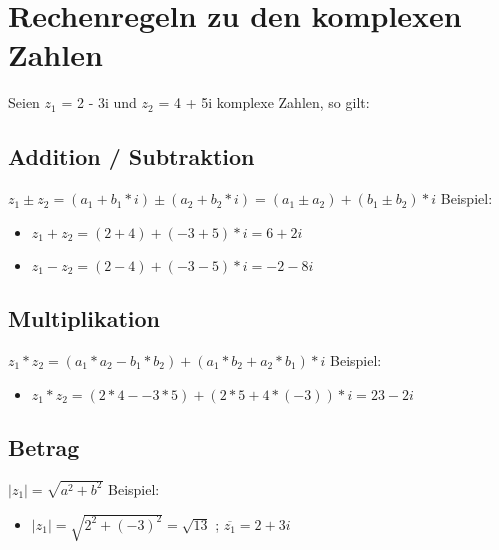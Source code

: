 \documentclass[12pt]{article}
\begin{document}
    \section{Rechenregeln zu den komplexen Zahlen}

    Seien $z_1$ = 2 - 3i und $z_2$ = 4 + 5i komplexe Zahlen, so gilt: \newline

    \subsection{Addition / Subtraktion}

    $z_1 \pm z_2 = (a_1 + b_1 * i) \pm (a_2 + b_2 * i) = (a_1 \pm a_2) + (b_1 \pm b_2) * i$ \newline
    \newline
    Beispiel:
    \begin{itemize}
        \item $z_1 + z_2 = (2 + 4) + (-3 + 5) * i = 6 + 2i$
        \item $z_1 - z_2 = (2 - 4) + (-3 - 5) * i = -2 - 8i$
    \end{itemize}


    \subsection{Multiplikation}

    $ z_1 * z_2 = (a_1 * a_2 - b_1 * b_2) + (a_1*b_2 + a_2 *b_1) * i$ \newline
    \newline
    Beispiel:

    \begin{itemize}
        \item $z_1 * z_2 = (2 * 4 - -3 * 5) + (2 * 5 + 4 * (-3)) * i = 23 - 2i$
    \end{itemize}

    \subsection{Betrag}

    $|z_1| = \sqrt{a^2 + b^2}$  \newline
    \newline
    Beispiel:
    \begin{itemize}
        \item $|z_1| = \sqrt{2^2 + (-3)^2} = \sqrt{13}$ ; $\overline{z_1} = 2 + 3i$
    \end{itemize}
\end{document}
